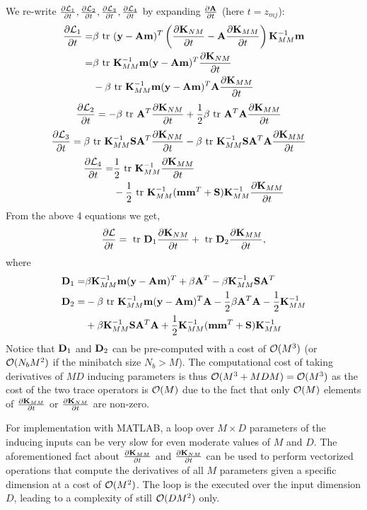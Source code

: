 \documentclass[]{article}
\begin{document}
\noindent We re-write $\deriv{\calL_1}{t}, \deriv{\calL_2}{t}, \deriv{ \calL_3}{t}, \deriv{\calL_4}{t}$ by expanding $\deriv{\A}{t}$ (here $t = z_{mj}$):
\begin{align}
\nonumber
\deriv{\calL_1}{t}
=& \beta \trace (\y - \A\m)^T \left(\deriv{\K_{NM}}{t} -  \A \deriv{ \K_{MM}}{t}\right)\K_{MM}^{-1} \m \\
\nonumber
=& \beta \trace \K_{MM}^{-1} \m (\y - \A\m)^T \deriv{\K_{NM}}{t} \\
&-\beta \trace \K_{MM}^{-1} \m (\y - \A\m)^T \A \deriv{\K_{MM}}{t}
\end{align}
\begin{align}
\deriv{\calL_2}{t}
&= - \beta \trace \A^T \deriv{\K_{NM}}{t}
 + \frac{1}{2} \beta \trace \A^T \A \deriv{\K_{MM}}{t}
 \end{align}
 \begin{align}
\deriv{\calL_3}{t}
&= \beta \trace \K_{MM}^{-1} \S \A^T \deriv{\K_{NM}}{t}
 - \beta \trace \K_{MM}^{-1} \S \A^T \A \deriv{\K_{MM}}{t}
 \end{align}
 \begin{align}
\deriv{\calL_4}{t}
 =& \frac{1}{2}  \trace \K_{MM}^{-1} \deriv{\K_{MM}}{t} \\
 \nonumber
& - \frac{1}{2} \trace \K_{MM}^{-1} (\m \m^T + \S) \K_{MM}^{-1} \deriv{\K_{MM}}{t} 
\end{align}
From the above 4 equations we get,
\begin{align}
\deriv{\calL}{t} = \trace \D_1 \deriv{\K_{NM}}{t} + \trace \D_2 \deriv{ \K_{MM}}{t},
\end{align}
where 
\begin{align}
\D_1 =& \beta \K_{MM}^{-1} \m (\y - \A\m)^T
 + \beta \A^T
 - \beta \K_{MM}^{-1} \S \A^T \\ \nonumber
\D_2 =& -\beta \trace \K_{MM}^{-1} \m (\y - \A\m)^T \A
 - \frac{1}{2} \beta \A^T \A -\frac{1}{2} \K_{MM}^{-1} \\
  &+ \beta \K_{MM}^{-1} \S \A^T \A	 
   + \frac{1}{2} \K_{MM}^{-1} (\m \m^T + \S) \K_{MM}^{-1}
\end{align}
Notice that $\D_1$ and $\D_2$ can be pre-computed with a cost of $\calO(M^3)$ (or $\calO(N_bM^2)$ if the minibatch size $N_b > M$).
The computational cost of taking derivatives of $MD$ inducing parameters is thus $\calO(M^3 + MDM) = \calO(M^3)$ as the cost of the two trace operators is $\calO(M)$ due to the fact that only $\calO(M)$ elements of $\deriv{\K_{MM}}{t}$ or $\deriv{\K_{NM}}{t}$ are non-zero.

For implementation with MATLAB, a loop over $M \times D$ parameters of the inducing inputs can be very slow for even moderate values of $M$ and $D$.
The aforementioned fact about $\deriv{\K_{MM}}{t}$ and $\deriv{\K_{NM}}{t}$ can be used to perform vectorized operations that compute the derivatives of all $M$ parameters given a specific dimension at a cost of $\calO(M^2)$.
The loop is the executed over the input dimension $D$, leading to a complexity of still $\calO(DM^2)$ only.



\end{document}
